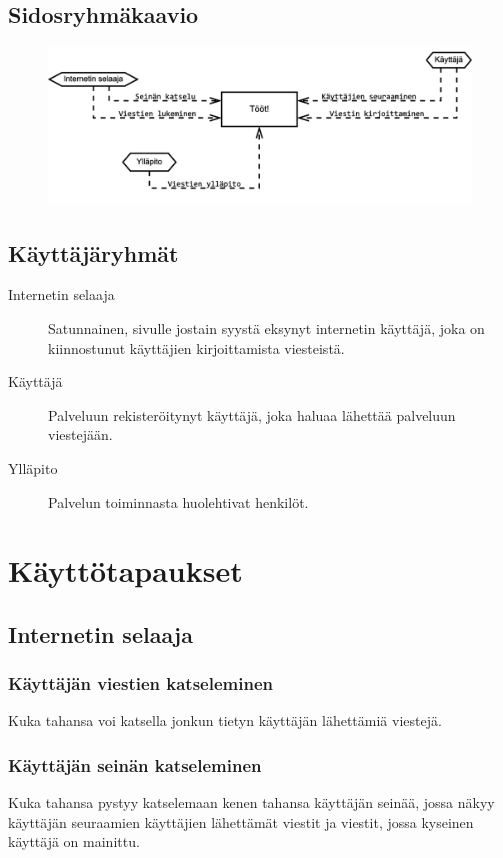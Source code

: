 \documentclass{article}
\let\stdsection\section
\renewcommand\section{\newpage\stdsection}
\begin{document}
\subsection{Sidosryhmäkaavio}

\begin{figure}[H]
    \centering
    \includegraphics[width=\textwidth]{sidosryhmat.pdf}
\end{figure}

\subsection{Käyttäjäryhmät}

\begin{description}
    \item[Internetin selaaja] Satunnainen, sivulle jostain syystä eksynyt internetin käyttäjä, joka on kiinnostunut käyttäjien kirjoittamista viesteistä.    
    \item[Käyttäjä] Palveluun rekisteröitynyt käyttäjä, joka haluaa lähettää palveluun viestejään.
    \item[Ylläpito] Palvelun toiminnasta huolehtivat henkilöt.
\end{description}

\section{Käyttötapaukset}

\subsection{Internetin selaaja}

\subsubsection{Käyttäjän viestien katseleminen}
Kuka tahansa voi katsella jonkun tietyn käyttäjän lähettämiä viestejä.

\subsubsection{Käyttäjän seinän katseleminen}
Kuka tahansa pystyy katselemaan kenen tahansa käyttäjän seinää, jossa näkyy käyttäjän seuraamien käyttäjien lähettämät viestit ja viestit, jossa kyseinen käyttäjä on mainittu.
\end{document}
